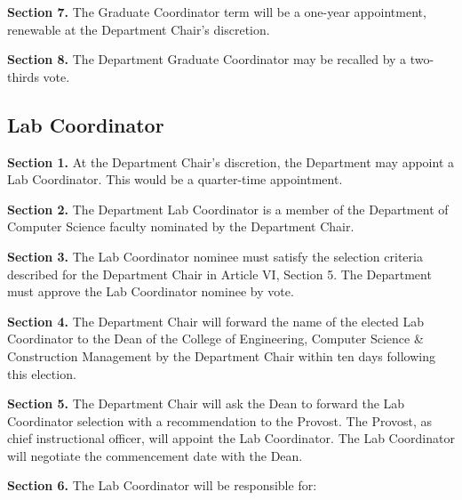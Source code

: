 \documentclass{scrartcl}
\begin{document}
\textbf{Section 7.} The Graduate Coordinator term will be a one-year appointment, renewable at the Department Chair’s discretion.

\textbf{Section 8.} The Department Graduate Coordinator may be recalled by a two-thirds vote.

\subsection*{Lab Coordinator}
{}


\textbf{Section 1.} At the Department Chair's discretion, the Department may appoint a Lab Coordinator. This would be a quarter-time appointment.

\textbf{Section 2.} The Department Lab Coordinator is a member of the Department of Computer Science faculty nominated by the Department Chair.

\textbf{Section 3.} The Lab Coordinator nominee must satisfy the selection criteria described for the Department Chair in Article VI, Section 5. The Department must approve the Lab Coordinator nominee by vote.

\textbf{Section 4.} The Department Chair will forward the name of the elected Lab Coordinator to the Dean of the College of Engineering, Computer Science \& Construction Management by the Department Chair within ten days following this election.

\textbf{Section 5.} The Department Chair will ask the Dean to forward the Lab Coordinator selection with a recommendation to the Provost. The Provost, as chief instructional officer, will appoint the Lab Coordinator. The Lab Coordinator will negotiate the commencement date with the Dean.

\textbf{Section 6.} The Lab Coordinator will be responsible for:
\end{document}
